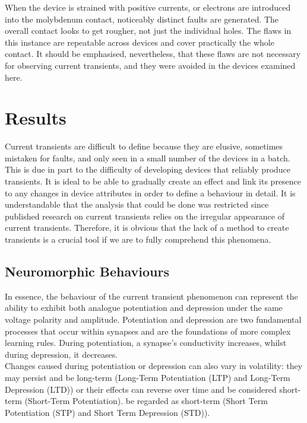 \noindent When the device is strained with positive currents, or electrons are introduced into the molybdenum contact, noticeably distinct faults are generated. The overall contact looks to get rougher, not just the individual holes. The flaws in this instance are repeatable across devices and cover practically the whole contact. It should be emphasised, nevertheless, that these flaws are not necessary for observing current transients, and they were avoided in the devices examined here.

\section[Results]{Results}

Current transients are difficult to define because they are elusive, sometimes mistaken for faults, and only seen in a small number of the devices in a batch. This is due in part to the difficulty of developing devices that reliably produce transients. It is ideal to be able to gradually create an effect and link its presence to any changes in device attributes in order to define a behaviour in detail. It is understandable that the analysis that could be done was restricted since published research on current transients relies on the irregular appearance of current transients. Therefore, it is obvious that the lack of a method to create transients is a crucial tool if we are to fully comprehend this phenomena.

\subsection[Neuromorphic Behaviours]{Neuromorphic Behaviours}

In essence, the behaviour of the current transient phenomenon can represent the ability to exhibit both analogue potentiation and depression under the same voltage polarity and amplitude. Potentiation and depression are two fundamental processes that occur within synapses and are the foundations of more complex learning rules. During potentiation, a synapse's conductivity increases, whilst during depression, it decreases. \\

\noindent Changes caused during potentiation or depression can also vary in volatility: they may persist and be long-term (Long-Term Potentiation (LTP) and Long-Term Depression (LTD)) or their effects can reverse over time and be considered short-term (Short-Term Potentiation). be regarded as short-term (Short Term Potentiation (STP) and Short Term Depression (STD)).\\

